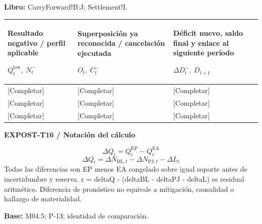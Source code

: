 \textbf{Libro:} CarryForward!B:J; Settlement!I.\par\endgroup
{\sffamily\fontsize{8.3}{10.3}\selectfont\begin{longtable}{@{}P{54.83mm} P{54.83mm} P{54.83mm}@{}}
\toprule
\textbf{Resultado negativo / perfil aplicable}\par {\normalfont\fontsize{8.2}{10}\selectfont $Q_t^{\mathrm{low}},\ N_t^-$} & \textbf{Superposición ya reconocida / cancelación ejecutada}\par {\normalfont\fontsize{8.2}{10}\selectfont $O_t,\ C_t^-$} & \textbf{Déficit nuevo, saldo final y enlace al siguiente período}\par {\normalfont\fontsize{8.2}{10}\selectfont $\Delta D_t^-,\ D_{t+1}$}\\\midrule\endhead
\rule{0pt}{8mm}[Completar] & [Completar] & [Completar]\\\hline
\rule{0pt}{8mm}[Completar] & [Completar] & [Completar]\\\hline
\rule{0pt}{8mm}[Completar] & [Completar] & [Completar]\\\hline
\end{longtable}}
\par\begingroup\sffamily\fontsize{8}{10}\selectfont\color{NEBGreen}\setlength{\parskip}{2pt}\setlength{\abovedisplayskip}{4pt}\setlength{\belowdisplayskip}{4pt}\setlength{\abovedisplayshortskip}{2pt}\setlength{\belowdisplayshortskip}{3pt}
\textbf{EXPOST-T16 / Notación del cálculo}\par
{\fontsize{9}{11}\selectfont\[ \Delta Q_t=Q_t^{\mathrm{EP}}-Q_t^{\mathrm{EA}} \]}
{\fontsize{9}{11}\selectfont\[ \Delta Q_t=\Delta N_{\mathrm{BL},t}-\Delta N_{\mathrm{PJ},t}-\Delta L_t \]}
Todas las diferencias son EP menos EA congelado sobre igual soporte antes de incertidumbre y reserva. r = deltaQ - (deltaBL - deltaPJ - deltaL) es residual aritmético. Diferencia de pronóstico no equivale a mitigación, causalidad o hallazgo de materialidad.\par
\textbf{Base:} M04.5; P-13; identidad de comparación.\par
